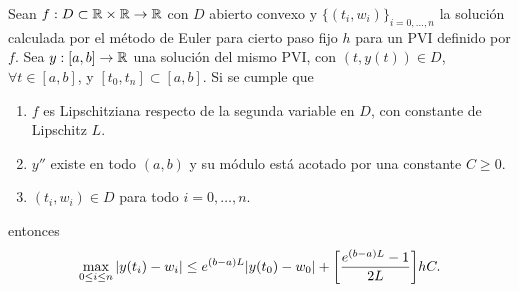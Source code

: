 \begin{theorem}\label{thm:euler-convergence}
    Sean $f : D \subset \mathbb{R} \times \mathbb{R} \to \mathbb{R}$ con $D$ abierto convexo
    y $\{(t_i, w_i)\}_{i = 0,\ldots, n}$
    la solución calculada por el método de Euler para cierto paso fijo $h$
    para un PVI definido por $f$.
    Sea $y : [a, b] \to \mathbb{R}$ una solución del mismo PVI,
    con $(t, y(t)) \in D$, $\forall t \in [a, b]$,
    y $[t_0, t_n] \subset [a, b]$.
    Si se cumple que
    \begin{enumerate}[label=(\alph*)]
        \item $f$ es Lipschitziana respecto de la segunda variable en $D$,
        con constante de Lipschitz $L$.
        \item $y''$ existe en todo $(a, b)$ y
        su módulo está acotado por una constante $C \ge 0$.
        \item $(t_i, w_i) \in D$ para todo $i = 0,\dots,n$.
    \end{enumerate}
    entonces
    \begin{equation*}
        \max_{0 \le i \le n} \abs{y(t_i)-w_i} \le
        e^{(b-a)L}\abs{y(t_0) - w_0} + \qty[\frac{e^{(b-a)L}-1}{2L}]hC.
    \end{equation*}
\end{theorem}

